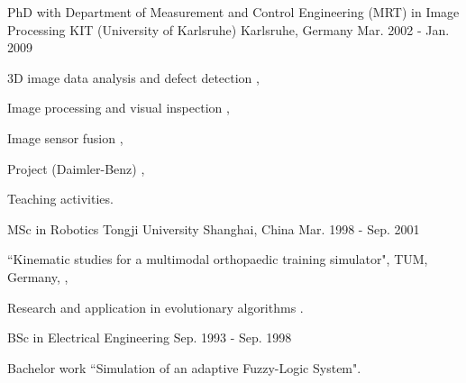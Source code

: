 \documentclass[../cv.tex]{subfiles}
\begin{document}
\begin{cventries}
  \cventry
    {PhD with Department of Measurement and Control Engineering (MRT) in Image Processing} %
    {KIT (University of Karlsruhe)} %
    {Karlsruhe, Germany} %
    {Mar. 2002 - Jan. 2009} %
    {
      \begin{cvitems} %
        \item 3D image data analysis and defect detection \supercite{xin2008diss},
        \item Image processing and visual inspection \supercite{xin2009multiscale} \supercite{xin2007evaluation},
        \item Image sensor fusion \supercite{xin2004bildfolgenauswertung},
        \item Project (Daimler-Benz) \supercite{Xin_Daimler_08},
        \item Teaching activities.
      \end{cvitems}
    }

  \cventry
    {MSc in Robotics} %
    {Tongji University} %
    {Shanghai, China} %
    {Mar. 1998 - Sep. 2001} %
    {
      \begin{cvitems} %
        \item ``Kinematic studies for a multimodal orthopaedic training simulator", TUM, Germany, \supercite{xin2002KneeSimulator},
        \item Research and application in evolutionary algorithms \supercite{xin2002AntColony}.
      \end{cvitems}
    }

  \cventry
    {BSc in Electrical Engineering} %
    {} %
    {} %
    {Sep. 1993 - Sep. 1998} %
    {
      \begin{cvitems} %
        \item Bachelor work ``Simulation of an adaptive Fuzzy-Logic System".
      \end{cvitems}
    }

\end{cventries}
\end{document}
